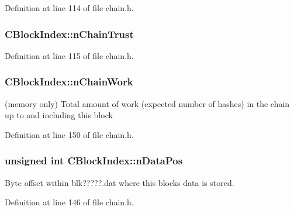 Definition at line 114 of file chain.\+h.

\hypertarget{class_c_block_index_aa11268e5a01c5a7d33fb313fb0494015}{}
\subsubsection[{n\+Chain\+Trust}]{ C\+Block\+Index\+::n\+Chain\+Trust}\label{class_c_block_index_aa11268e5a01c5a7d33fb313fb0494015}


Definition at line 115 of file chain.\+h.

\hypertarget{class_c_block_index_a8451dbcf199348b9efe4ee3625e9b0f0}{}
\subsubsection[{n\+Chain\+Work}]{ C\+Block\+Index\+::n\+Chain\+Work}\label{class_c_block_index_a8451dbcf199348b9efe4ee3625e9b0f0}


(memory only) Total amount of work (expected number of hashes) in the chain up to and including this block 



Definition at line 150 of file chain.\+h.

\hypertarget{class_c_block_index_af164283dfb2d62ac44be8d10446bce4a}{}
\subsubsection[{n\+Data\+Pos}]{\setlength{\rightskip}{0pt plus 5cm}unsigned int C\+Block\+Index\+::n\+Data\+Pos}\label{class_c_block_index_af164283dfb2d62ac44be8d10446bce4a}


Byte offset within blk?????.dat where this block\textquotesingle{}s data is stored. 



Definition at line 146 of file chain.\+h.

\hypertarget{class_c_block_index_a3bf9ecd8938c42be6a4b14d3c7ef5c21}{}
